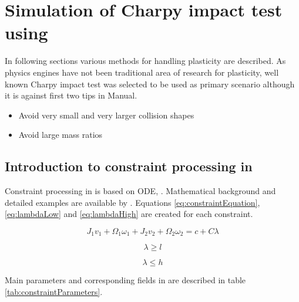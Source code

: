 \section{Simulation of Charpy impact test using \bullet}
\label{sec:bullet-charpy}

In following sections various methods for handling plasticity are described.
As physics engines have not been traditional area of research for plasticity, 
well known Charpy impact test was selected to be used as primary scenario
although it is against first two tips in \bullet Manual.

\begin{itemize}
\item Avoid very small and very larger collision shapes
\item Avoid large mass ratios
\end{itemize}

\subsection{Introduction to constraint processing in \bullet}
Constraint processing in \bullet is based on ODE, \cite{ode}.
Mathematical background and detailed examples are available by \cite{ode.joints}.
Equations \ref{eq:constraintEquation}, \ref{eq:lambdaLow} and
\ref{eq:lambdaHigh} 
are created for each constraint.

\begin{equation} \label{eq:constraintEquation}
J_1 v_1 + \Omega_1 \omega_1 + J_2 v_2 + \Omega_2 \omega_2 = c + C \lambda
\end{equation}

\begin{equation} \label{eq:lambdaLow}
\lambda \geq l
\end{equation}

\begin{equation} \label{eq:lambdaHigh}
\lambda \leq h
\end{equation}

Main parameters  and corresponding fields in \bullet 
 are described in table \ref{tab:constraintParameters}.

